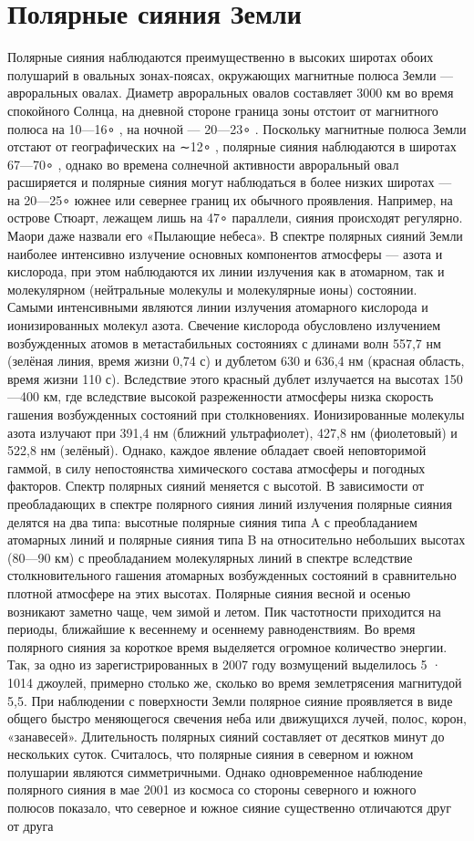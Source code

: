 \documentclass[a4paper,14pt]{article}
\begin{document}
\section{Полярные сияния Земли}
Полярные сияния наблюдаются преимущественно в высоких широтах
обоих полушарий в овальных зонах-поясах, окружающих магнитные полюса Земли — авроральных овалах. Диаметр авроральных овалов составляет 3000 км во время спокойного Солнца, на дневной стороне граница
зоны отстоит от магнитного полюса на 10—16∘
, на ночной — 20—23∘
. Поскольку магнитные полюса Земли отстают от географических на ∼12∘
,
полярные сияния наблюдаются в широтах 67—70∘
, однако во времена
солнечной активности авроральный овал расширяется и полярные сияния могут наблюдаться в более низких широтах — на 20—25∘ южнее или
севернее границ их обычного проявления. Например, на острове Стюарт,
лежащем лишь на 47∘ параллели, сияния происходят регулярно. Маори
даже назвали его «Пылающие небеса».
В спектре полярных сияний Земли наиболее интенсивно излучение
основных компонентов атмосферы — азота и кислорода, при этом наблюдаются их линии излучения как в атомарном, так и молекулярном (нейтральные молекулы и молекулярные ионы) состоянии. Самыми интенсивными являются линии излучения атомарного кислорода и ионизированных молекул азота.
Свечение кислорода обусловлено излучением возбужденных атомов в метастабильных состояниях с длинами волн 557,7 нм (зелёная линия,
время жизни 0,74 с) и дублетом 630 и 636,4 нм (красная область, время
жизни 110 с). Вследствие этого красный дублет излучается на высотах
150—400 км, где вследствие высокой разреженности атмосферы низка
скорость гашения возбужденных состояний при столкновениях. Ионизированные молекулы азота излучают при 391,4 нм (ближний ультрафиолет), 427,8 нм (фиолетовый) и 522,8 нм (зелёный). Однако, каждое
явление обладает своей неповторимой гаммой, в силу непостоянства химического состава атмосферы и погодных факторов.
Спектр полярных сияний меняется с высотой. В зависимости от преобладающих в спектре полярного сияния линий излучения полярные сияния делятся на два типа: высотные полярные сияния типа A с преобладанием атомарных линий и полярные сияния типа B на относительно
небольших высотах (80—90 км) с преобладанием молекулярных линий в
спектре вследствие столкновительного гашения атомарных возбужденных состояний в сравнительно плотной атмосфере на этих высотах.
Полярные сияния весной и осенью возникают заметно чаще, чем зимой и летом. Пик частотности приходится на периоды, ближайшие к
весеннему и осеннему равноденствиям. Во время полярного сияния за
короткое время выделяется огромное количество энергии. Так, за одно
из зарегистрированных в 2007 году возмущений выделилось 5 · 1014 джоулей, примерно столько же, сколько во время землетрясения магнитудой
5,5.
При наблюдении с поверхности Земли полярное сияние проявляется
в виде общего быстро меняющегося свечения неба или движущихся лучей, полос, корон, «занавесей». Длительность полярных сияний составляет от десятков минут до нескольких суток. Считалось, что полярные
сияния в северном и южном полушарии являются симметричными. Однако одновременное наблюдение полярного сияния в мае 2001 из космоса
со стороны северного и южного полюсов показало, что северное и южное сияние существенно отличаются друг от друга
\end{document}
